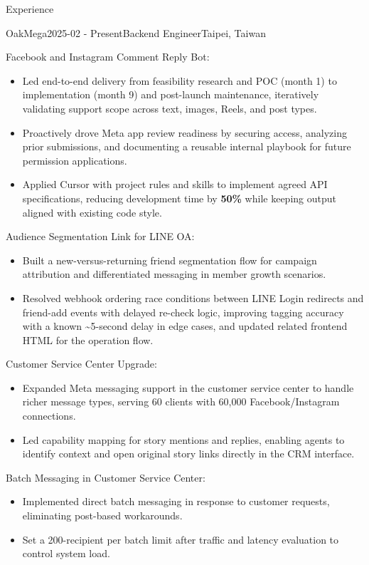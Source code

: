 \documentclass[
	11pt, %
]{resume} %
\newenvironment{myitemize}
  {\begin{itemize}
    \setlength{\itemsep}{-0.5em} \vspace{-0.5em}
  } %
  {\end{itemize}}
\begin{document}
\begin{rSection}{Experience}

	\begin{rSubsection}{OakMega}{2025-02 - Present}{Backend Engineer}{Taipei, Taiwan}
    \item Facebook and Instagram Comment Reply Bot:
    \begin{myitemize}
      \item Led end-to-end delivery from feasibility research and POC (month 1) to implementation (month 9) and post-launch maintenance, iteratively validating support scope across text, images, Reels, and post types.
      \item Proactively drove Meta app review readiness by securing access, analyzing prior submissions, and documenting a reusable internal playbook for future permission applications.
      \item Applied Cursor with project rules and skills to implement agreed API specifications, reducing development time by \textbf{50\%} while keeping output aligned with existing code style.
    \end{myitemize}
    \item Audience Segmentation Link for LINE OA:
    \begin{myitemize}
      \item Built a new-versus-returning friend segmentation flow for campaign attribution and differentiated messaging in member growth scenarios.
      \item Resolved webhook ordering race conditions between LINE Login redirects and friend-add events with delayed re-check logic, improving tagging accuracy with a known \textasciitilde5-second delay in edge cases, and updated related frontend HTML for the operation flow.
    \end{myitemize}
    \item Customer Service Center Upgrade:
    \begin{myitemize}
      \item Expanded Meta messaging support in the customer service center to handle richer message types, serving 60 clients with 60,000 Facebook/Instagram connections.
      \item Led capability mapping for story mentions and replies, enabling agents to identify context and open original story links directly in the CRM interface.
    \end{myitemize}
    \item Batch Messaging in Customer Service Center:
    \begin{myitemize}
      \item Implemented direct batch messaging in response to customer requests, eliminating post-based workarounds.
      \item Set a 200-recipient per batch limit after traffic and latency evaluation to control system load.
    \end{myitemize}
  \end{rSubsection}


\end{rSection}
\end{document}
